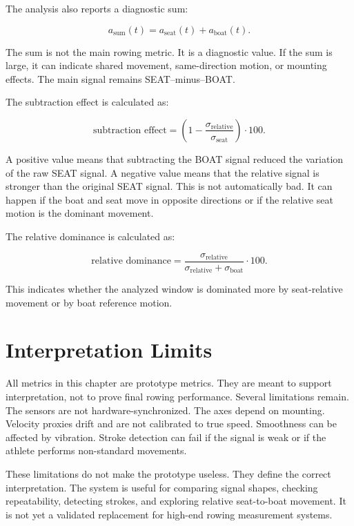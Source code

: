 The analysis also reports a diagnostic sum:

\begin{equation}
  a_{\text{sum}}(t)
  = a_{\text{seat}}(t) + a_{\text{boat}}(t).
\end{equation}

The sum is not the main rowing metric. It is a diagnostic value. If the sum is large, it can indicate shared movement, same-direction motion, or mounting effects. The main signal remains SEAT--minus--BOAT.

The subtraction effect is calculated as:

\begin{equation}
  \text{subtraction effect}
  =
  \left(1 -
  \frac{\sigma_{\text{relative}}}
  {\sigma_{\text{seat}}}
  \right) \cdot 100.
\end{equation}

A positive value means that subtracting the BOAT signal reduced the variation of the raw SEAT signal. A negative value means that the relative signal is stronger than the original SEAT signal. This is not automatically bad. It can happen if the boat and seat move in opposite directions or if the relative seat motion is the dominant movement.

The relative dominance is calculated as:

\begin{equation}
  \text{relative dominance}
  =
  \frac{\sigma_{\text{relative}}}
  {\sigma_{\text{relative}} + \sigma_{\text{boat}}}
  \cdot 100.
\end{equation}

This indicates whether the analyzed window is dominated more by seat-relative movement or by boat reference motion.

\section{Interpretation Limits}

All metrics in this chapter are prototype metrics. They are meant to support interpretation, not to prove final rowing performance. Several limitations remain. The sensors are not hardware-synchronized. The axes depend on mounting. Velocity proxies drift and are not calibrated to true speed. Smoothness can be affected by vibration. Stroke detection can fail if the signal is weak or if the athlete performs non-standard movements.

These limitations do not make the prototype useless. They define the correct interpretation. The system is useful for comparing signal shapes, checking repeatability, detecting strokes, and exploring relative seat-to-boat movement. It is not yet a validated replacement for high-end rowing measurement systems.


